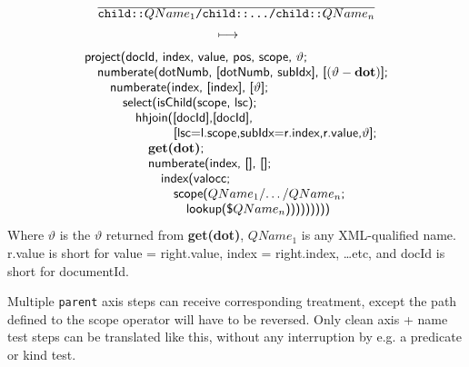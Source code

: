 \begin{equation}
\begin{array}{c}
\frac{}{\displaystyle \mbox{\texttt{child::}}QName_1\mbox{\texttt{/child::\ldots/child::}}QName_n} \\ 
\longmapsto \begin{array}{c}\mbox{\tiny } \\ \mbox{\tiny } \end{array} \\
\begin{array}{l}
\mbox{\textsf{project(docId, index, value, pos, scope, }}\vartheta\mbox{\textsf{;}} \\ \quad
\mbox{\textsf{numberate(dotNumb, [dotNumb, subIdx], [}}(\vartheta-\mbox{\textbf{dot}})\mbox{\textsf{];}} \\
\quad\quad 
\mbox{\textsf{numberate(index, [index], [}}\vartheta\mbox{\textsf{];}} \\ \quad\quad\quad
\mbox{\textsf{select(isChild(scope, lsc);}} \\ \quad \quad\quad\quad
\mbox{\textsf{hhjoin([docId],[docId],}} \\ \quad\quad\quad\quad\quad\quad\quad
\mbox{\textsf{[lsc=l.scope,subIdx=r.index,r.value,}}\vartheta\mbox{\textsf{];}}\\
\quad\quad\quad\quad\quad \mbox{\textbf{get(dot)}\textsf{;}} \\ \quad \quad\quad \quad\quad
\mbox{\textsf{numberate(index, [], [];}}\\ \quad\quad\quad\quad\quad\quad
\mbox{\textsf{index(valocc;}} \\ \quad\quad\quad\quad\quad\quad\quad
\mbox{\textsf{scope(}}QName_1\mbox{\textsf{/\ldots/}}QName_n\mbox{\textsf{;}}\\
\quad\quad\quad\quad\quad\quad\quad\quad
\mbox{\textsf{lookup(\$}}QName_n\mbox{\textsf{)))))))))}}
\end{array}
\end{array}
\label{rule:trans:TD:pathChild}
\end{equation}
Where $\vartheta$ is the $\vartheta$ returned from \textbf{get(dot)}, $QName_1$ is any XML-qualified name.
\textsf{r.value} is short for \textsf{value = right.value, index = right.index, \ldots etc}, and \textsf{docId} is
short for \textsf{documentId}.

Multiple \texttt{parent} axis steps can receive corresponding treatment, except the path defined to the
\textsf{scope} operator will have to be reversed. Only clean axis + name test steps can be translated
like this, without any interruption by e.g. a predicate or kind test.

